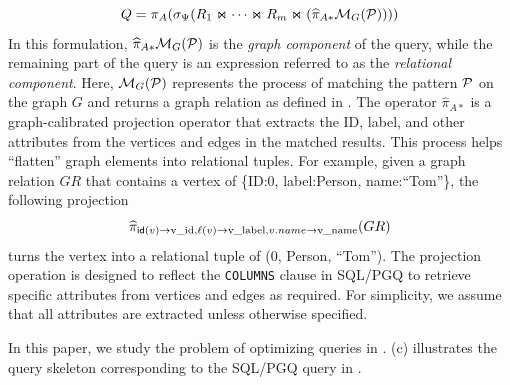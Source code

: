 \begin{equation}
    \label{eq:spjm}
Q = \pi_A(\sigma_\Psi(R_1 \Join \cdots \Join R_m \Join (\widehat{\pi}_{A*}\mathcal{M}_G(\mathcal{P}))))
\end{equation}
In this formulation, \(\widehat{\pi}_{A*}\mathcal{M}_G(\mathcal{P})\) is the \emph{graph component} of
the query, while the remaining part of the query is an \spj expression referred to as the \emph{relational component}.
Here, \(\mathcal{M}_G(\mathcal{P})\) represents the process of matching the pattern \(\mathcal{P}\) on the graph \(G\) and
returns a graph relation as defined in . The operator \(\widehat{\pi}_{A*}\) is a
graph-calibrated projection operator that extracts the ID, label, and other attributes from the vertices and edges in the matched results.
This process helps ``flatten'' graph elements into relational tuples.
For example, given a graph relation $GR$ that contains a vertex of \{ID:0, label:Person, name:``Tom''\}, the
following projection
\[
\widehat{\pi}_{{\mathsf{id}}(v) \rightarrow \text{v\_id}, \mathcal{\ell}(v) \rightarrow \text{v\_label}, v.name \rightarrow \text{v\_name}}(GR)
\]
turns the vertex into a relational tuple of (0, Person, ``Tom'').
The projection operation is designed to reflect the \lstinline{COLUMNS} clause in SQL/PGQ
to retrieve specific attributes from vertices and edges as required. For simplicity, we assume that all
attributes are extracted unless otherwise specified.

In this paper, we study the problem of optimizing \spjm queries in . (c) illustrates the \spjm query skeleton corresponding to the SQL/PGQ query in .


